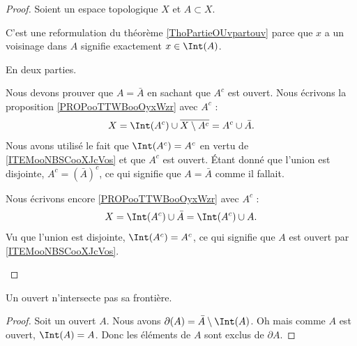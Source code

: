 \begin{proof}
	Soient un espace topologique \( X\) et \( A\subset X\).
	\begin{subproof}
		C'est une reformulation du théorème \ref{ThoPartieOUvpartouv} parce que \( x\) a un voisinage dans \( A\) signifie exactement \( x\in \Int(A)\).

		En deux parties.
		\begin{subproof}
			Nous devons prouver que \( A=\bar A\) en sachant que \( A^c\) est ouvert. Nous écrivons la proposition \ref{PROPooTTWBooOyxWzr} avec \( A^c\) :
			\begin{equation}
				X=\Int(A^c)\cup \overline{X\setminus A^c}=A^c\cup \bar A.
			\end{equation}
			Nous avons utilisé le fait que \( \Int(A^c)=A^c\) en vertu de \ref{ITEMooNBSCooXJcVos} et que \( A^c\) est ouvert. Étant donné que l'union est disjointe, \( A^c=(\bar A)^c\), ce qui signifie que \( A=\bar A\) comme il fallait.

			\spitem[Si \( A=\bar A\)]
			Nous écrivons encore \ref{PROPooTTWBooOyxWzr} avec \( A^c\) :
			\begin{equation}
				X=\Int(A^c)\cup \bar A=\Int(A^c)\cup A.
			\end{equation}
			Vu que l'union est disjointe, \( \Int(A^c)=A^c\), ce qui signifie que \( A\) est ouvert par \ref{ITEMooNBSCooXJcVos}.
		\end{subproof}
	\end{subproof}
\end{proof}

\begin{proposition}	\label{PROPooFHURooGXcekV}
	Un ouvert n'intersecte pas sa frontière.
\end{proposition}

\begin{proof}
	Soit un ouvert \( A\). Nous avons \( \partial(A)=\bar A\setminus\Int(A)\). Oh mais comme \( A\) est ouvert, \(  \Int(A)=A\). Donc les éléments de \( A\) sont exclus de \( \partial A\).
\end{proof}

